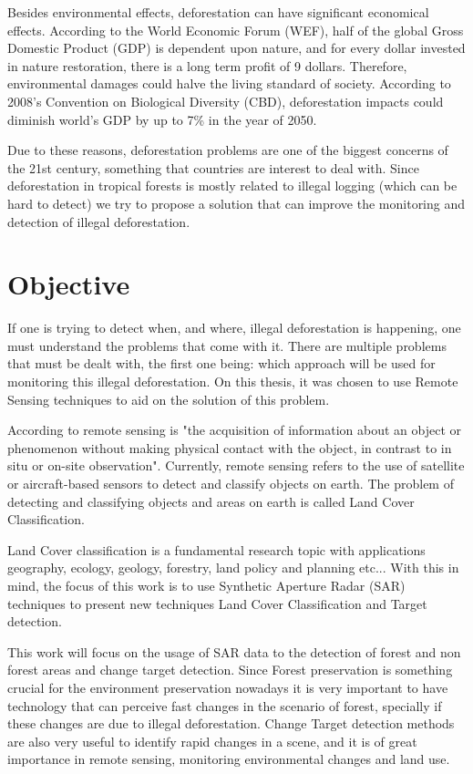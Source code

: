 Besides environmental effects, deforestation can have significant economical effects. According to the World Economic Forum (WEF), half of the global Gross Domestic Product (GDP)
is dependent upon nature, and for every dollar invested in nature restoration, there is a long term profit of 9 dollars. Therefore, environmental damages could halve the living standard of society.
According to 2008's Convention on Biological Diversity (CBD), deforestation impacts could diminish world's GDP by up to 7\% in the year of 2050.

Due to these reasons, deforestation problems are one of the biggest concerns of the 21st century, something that countries are interest to deal with. Since deforestation in tropical forests is mostly related to illegal
logging (which can be hard to detect) we try to propose a solution that can improve the monitoring and detection of illegal deforestation.

\section{Objective}

If one is trying to detect when, and where, illegal deforestation is happening, one must understand the problems that come with it. There are multiple problems that must be dealt with, the first one being: which approach will be used for
monitoring this illegal deforestation. On this thesis, it was chosen to use Remote Sensing techniques to aid on the solution of this problem.

According to \cite{Schott1996RemoteST} remote sensing is "the acquisition of information about an object or phenomenon without making physical contact with the object, in contrast to in situ or on-site observation". Currently, remote sensing
refers to the use of satellite or aircraft-based sensors to detect and classify objects on earth. The problem of detecting and classifying objects and areas on earth is called Land Cover Classification.

Land Cover classification is a fundamental research topic with applications geography,
ecology, geology, forestry, land policy and planning etc... With this in mind, the focus of this work is to use Synthetic Aperture Radar (SAR) techniques to present
new techniques Land Cover Classification and Target detection.

This work will focus on the usage of SAR data to the detection of forest and non
forest areas and change target detection. Since Forest preservation is something crucial
for the environment preservation nowadays it is very important to have technology that
can perceive fast changes in the scenario of forest, specially if these changes are due to
illegal deforestation. Change Target detection methods are also very useful to identify
rapid changes in a scene, and it is of great importance in remote sensing, monitoring
environmental changes and land use.

